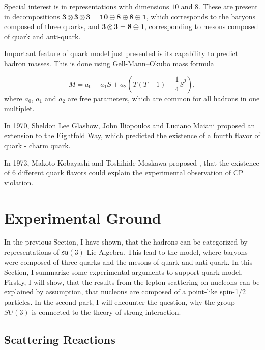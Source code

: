 Special interest is in representations with dimensions $10$ and $8$. These
are present in decompositions $\mathbf{3} \otimes \mathbf{3} \otimes
\mathbf{3} = \mathbf{10} \oplus \mathbf{8} \oplus \mathbf{8} \oplus \mathbf{1}$,
which corresponds to the baryons composed of three quarks, and $\mathbf{3}
\otimes \bar{\mathbf{3}} = \mathbf{8} \oplus \mathbf{1}$, corresponding to
mesons composed of quark and anti-quark.

Important feature of quark model just presented is its capability to predict
hadron masses. This is done using Gell-Mann--Okubo mass formula
\cite{Gell-Mann:1250016,Okubo01051962}

\begin{equation}
  M = a_0 + a_1 S + a_2 \left( T(T+1) - \frac{1}{4}S^2 \right),
  \label{eq:GellMannOkubo}
\end{equation}
where $a_0$, $a_1$ and $a_2$ are free parameters, which are common for all
hadrons in one multiplet. 

In 1970, Sheldon Lee Glashow, John Iliopoulos and Luciano Maiani proposed
\cite{Quarks4} an extension to the Eightfold Way, which predicted the existence of
a fourth flavor of quark - charm quark. 

In 1973, Makoto Kobayashi and Toshihide Moskawa proposed \cite{Quarks6}, that the
existence of 6 different quark flavors could explain the experimental
observation of CP violation.


\section{Experimental Ground}

In the previous Section, I have shown, that the hadrons can be categorized by
representations of $\mathfrak{su}(3)$ Lie Algebra. 
This lead to the model, where baryons were composed of three quarks and the
mesons of quark and anti-quark. 
In this Section, I summarize some experimental arguments to
support quark model.
Firstly, I will show, that the results from the lepton
scattering on nucleons can be explained by assumption, that nucleons are
composed of a point-like spin-1/2 particles.
In the second part, I will encounter the question, why the group $SU(3)$ is
connected to the theory of strong interaction. 

\subsection{Scattering Reactions}

